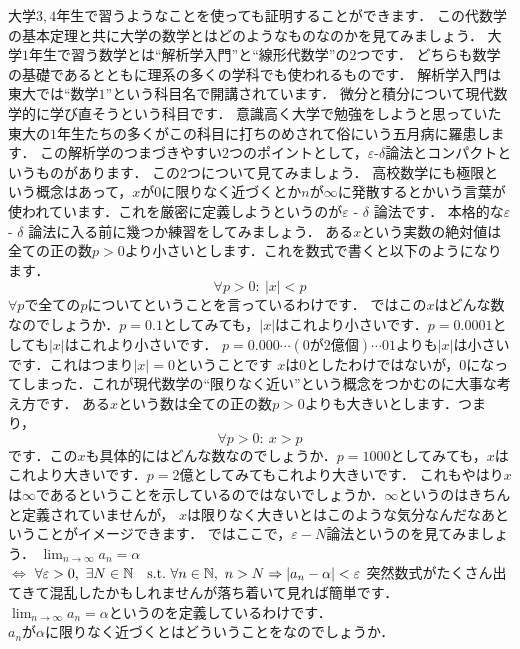 大学$3,4$年生で習うようなことを使っても証明することができます．
この代数学の基本定理と共に大学の数学とはどのようなものなのかを見てみましょう．
大学$1$年生で習う数学とは``解析学入門''と``線形代数学''の$2$つです．
どちらも数学の基礎であるとともに理系の多くの学科でも使われるものです．
解析学入門は東大では``数学$1$''という科目名で開講されています．
微分と積分について現代数学的に学び直そうという科目です．
意識高く大学で勉強をしようと思っていた東大の$1$年生たちの多くがこの科目に打ちのめされて俗にいう五月病に羅患します．
この解析学のつまづきやすい$2$つのポイントとして，\large{$\varepsilon$-$\delta$論法}と\large{コンパクト}というものがあります．
この$2$つについて見てみましょう．
高校数学にも極限という概念はあって，$x$が$0$に限りなく近づくとか$n$が$\infty$に発散するとかいう言葉が使われています．これを厳密に定義しようというのが$\varepsilon$ - $\delta$ 論法です．
本格的な$\varepsilon$ - $\delta$ 論法に入る前に幾つか練習をしてみましょう．
\ex
ある$x$という実数の絶対値は全ての正の数$p>0$より小さいとします．これを数式で書くと以下のようになります．
\[
\forall p > 0 : \ |x| < p
\]
$\forall p$で全ての$p$についてということを言っているわけです．
ではこの$x$はどんな数なのでしょうか．$p=0.1$としてみても，$|x|$はこれより小さいです．$p=0.0001$としても$|x|$はこれより小さいです．
$p=0.000\cdots (0が2億個) \cdots 01$よりも$|x|$は小さいです．これはつまり$|x| = 0$ということです
$x$は$0$としたわけではないが，$0$になってしまった．これが現代数学の``限りなく近い''という概念をつかむのに大事な考え方です．
\exx
\ex
ある$x$という数は全ての正の数$p>0$よりも大きいとします．つまり，
\[
\forall p > 0 : \ x > p
\]
です．この$x$も具体的にはどんな数なのでしょうか．$p=1000$としてみても，$x$はこれより大きいです．$p=2億$としてみてもこれより大きいです．
これもやはり$x$は$\infty$であるということを示しているのではないでしょうか．$\infty$というのはきちんと定義されていませんが，
$x$は限りなく大きいとはこのような気分なんだなあということがイメージできます．
\exx
ではここで，$\varepsilon-N$論法というのを見てみましょう．
$\lim_{n\to\infty} a_n = \alpha $\\
$\iff$
$\forall \varepsilon > 0,\  \exists N \in \mathbb N \quad \textrm{s.t.}\  \forall n \in \mathbb N,\  n > N \Rightarrow |a_n - \alpha | < \varepsilon $
突然数式がたくさん出てきて混乱したかもしれませんが落ち着いて見れば簡単です．\\
$\lim_{n\to\infty} a_n = \alpha $というのを定義しているわけです．\\
$a_n$が$\alpha$に限りなく近づくとはどういうことをなのでしょうか．\\
